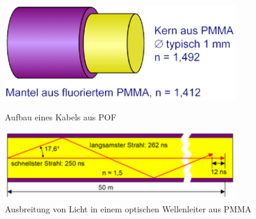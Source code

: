 \begin{figure}[h]
    \begin{center}
        \begin{minipage}[t]{0.4\textwidth}
            \begin{center}
                \includegraphics[width=0.9\textwidth]{Bilder/Optische_Wellenleiter_Die_Polymer_Optische_Faser/Funktionsweise/pofprinzip.png}
                \caption[Aufbau eines Kabels aus POF \newline \url{http://www.pofac.fh-nuernberg.de/pofac/de/was_sind_pof/images/pof_prinzip.png}]{Aufbau eines Kabels aus POF}
                \label{fig:pofprinzip}
            \end{center}
        \end{minipage}
        \hspace{0.025\textwidth}
        \begin{minipage}[t]{0.4\textwidth}
            \begin{center}
                \includegraphics[width=0.9\textwidth]{Bilder/Optische_Wellenleiter_Die_Polymer_Optische_Faser/Funktionsweise/poflichtausbreitung.png}
                \caption[Ausbreitung von Licht in einem optischen Wellenleiter aus PMMA \newline \url{http://www.pofac.info/typo3temp/pics/7eee584dce.jpg}]{Ausbreitung von Licht in einem optischen Wellenleiter aus PMMA}
                \label{fig:poflichtausbreitung}
            \end{center}
        \end{minipage}
    \end{center}
\end{figure}
